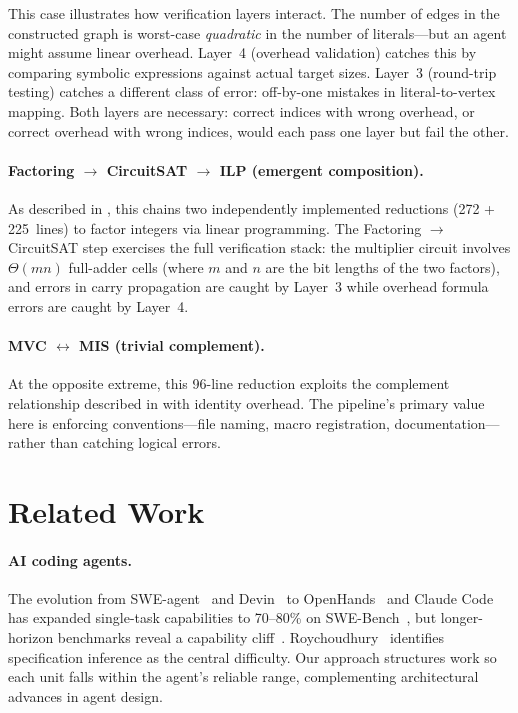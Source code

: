 \documentclass[conference]{IEEEtran}
\begin{document}
This case illustrates how verification layers interact.
The number of edges in the constructed graph is worst-case \emph{quadratic} in the number of literals---but an agent might assume linear overhead.
Layer~4 (overhead validation) catches this by comparing symbolic expressions against actual target sizes.
Layer~3 (round-trip testing) catches a different class of error: off-by-one mistakes in literal-to-vertex mapping.
Both layers are necessary: correct indices with wrong overhead, or correct overhead with wrong indices, would each pass one layer but fail the other.

\paragraph{Factoring $\to$ CircuitSAT $\to$ ILP (emergent composition).}
As described in , this chains two independently implemented reductions (272 + 225~lines) to factor integers via linear programming.
The Factoring $\to$ CircuitSAT step exercises the full verification stack: the multiplier circuit involves $\Theta(mn)$ full-adder cells (where $m$ and $n$ are the bit lengths of the two factors), and errors in carry propagation are caught by Layer~3 while overhead formula errors are caught by Layer~4.

\paragraph{MVC $\leftrightarrow$ MIS (trivial complement).}
At the opposite extreme, this 96-line reduction exploits the complement relationship described in  with identity overhead.
The pipeline's primary value here is enforcing conventions---file naming, macro registration, documentation---rather than catching logical errors.

\section{Related Work}\label{sec:related}

\paragraph{AI coding agents.}
The evolution from SWE-agent~\cite{Yang2024SWEagent} and Devin~\cite{Wu2024Devin} to OpenHands~\cite{Wang2024OpenHands} and Claude Code~\cite{Anthropic2025ClaudeCode} has expanded single-task capabilities to 70--80\% on SWE-Bench~\cite{Xia2025LiveSWEagent}, but longer-horizon benchmarks reveal a capability cliff~\cite{Thai2025SWEEVO, Deng2025SWEBenchPro}.
Roychoudhury~\cite{Roychoudhury2025AgenticAI} identifies specification inference as the central difficulty.
Our approach structures work so each unit falls within the agent's reliable range, complementing architectural advances in agent design.
\end{document}

